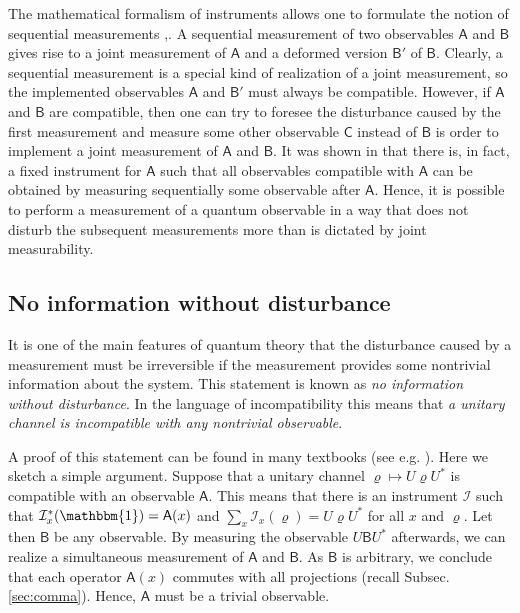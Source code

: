 \documentclass[12pt]{article}
\theoremstyle{definition}
\newcommand{\id}{\mathbbm{1}} %
\newcommand{\Ao}{\mathsf{A}}%
\newcommand{\Bo}{\mathsf{B}}%
\newcommand{\Co}{\mathsf{C}}%
\newcommand{\Ii}{\mathcal{I}}
\begin{document}
{The mathematical formalism of instruments allows one to formulate the notion of sequential measurements \cite{DaLe70},\cite{BuCaLa90}.
A sequential measurement of two observables $\Ao$ and $\Bo$ gives rise to a joint measurement of $\Ao$ and a deformed version $\Bo'$ of $\Bo$.
Clearly, a sequential measurement is a special kind of realization of a joint measurement, so the implemented observables $\Ao$ and $\Bo'$ must always be compatible. 
However, if  $\Ao$ and $\Bo$ are compatible, then one can try to foresee the disturbance caused by the first measurement and measure some other observable $\Co$ instead of $\Bo$ is order to implement a joint measurement of $\Ao$ and $\Bo$.
It was shown in \cite{HeMi15} that there is, in fact, a fixed instrument for $\Ao$ such that all observables compatible with $\Ao$ can be obtained by measuring sequentially some observable after $\Ao$. 
Hence, it is possible to perform a measurement of a quantum observable in a way that does not
disturb the subsequent measurements more than is dictated by joint measurability.

\subsection{No information without disturbance}\label{sec:no-info}

It is one of the main features of quantum theory that the disturbance
caused by a measurement must be irreversible if the measurement provides some nontrivial information about the system. This statement is known as \emph{no information without disturbance}. 
In the language of incompatibility this means that \emph{a unitary channel is incompatible with any nontrivial observable}. 

A proof of this statement can be found in many textbooks 
(see e.g. \cite{MLQT12}). Here we sketch a simple argument.  
Suppose that a unitary channel 
$\varrho \mapsto U \varrho U^*$ is compatible with an observable $\Ao$. 
This means that there is an instrument $\Ii$ such that 
$\Ii_x^*(\id)=\Ao(x)$ and $\sum_x \Ii_x(\varrho) = U\varrho U^*$ for all $x$ and $\varrho$. 
Let then $\Bo$ be any observable.
By measuring the observable $U\Bo U^*$ afterwards, 
we can realize a simultaneous measurement of $\Ao$ and $\Bo$.
As $\Bo$ is arbitrary, we conclude that each operator $\Ao(x)$ commutes with all projections (recall Subsec. \ref{sec:comma}).
Hence, $\Ao$ must be a trivial observable. 


}
\end{document}

